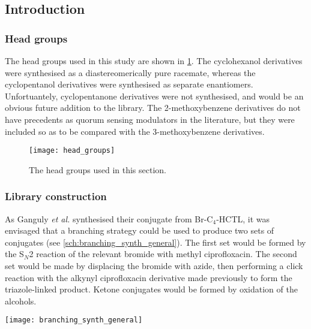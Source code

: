 \subsection{Introduction}

\subsubsection{Head groups}

The head groups used in this study are shown in \ref{fig:head_groups}. The cyclohexanol derivatives were synthesised as a diastereomerically pure racemate, whereas the cyclopentanol derivatives were synthesised as separate enantiomers. Unfortuantely, cyclopentanone derivatives were not synthesised, and would be an obvious future addition to the library. The 2-methoxybenzene derivatives do not have precedents as quorum sensing modulators in the literature, but they were included so as to be compared with the 3-methoxybenzene derivatives.


\begin{figure}[H]
	\begin{center}
		\texttt{[image: head\_groups]}
		\caption{The head groups used in this section.\label{fig:head_groups}}
	\end{center}
\end{figure}

\subsubsection{Library construction}

As Ganguly \textit{et al.}\cite{Ganguly2001} synthesised their conjugate from Br-C$_4$-HCTL, it was envisaged that a branching strategy could be used to produce two sets of conjugates (see \ref{sch:branching_synth_general}). The first set would be formed by the S$_N$2 reaction of the relevant bromide with methyl ciprofloxacin. The second set would be made by displacing the bromide with azide, then performing a click reaction with the alkynyl ciprofloxacin derivative  made previously to form the triazole-linked product. Ketone conjugates would be formed by oxidation of the alcohols.

\begin{scheme}[H]
	\begin{center}
		\texttt{[image: branching\_synth\_general]}
		\caption{\label{sch:branching_synth_general}}
	\end{center}
\end{scheme}

